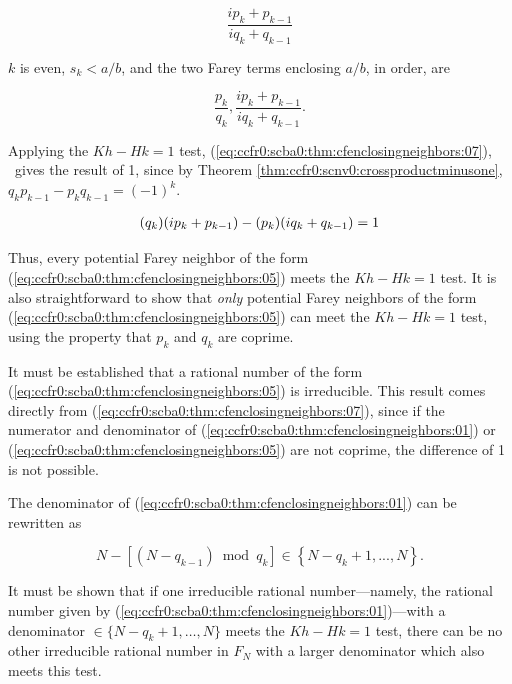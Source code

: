 \begin{vworktheoremproof}
\begin{equation}
\label{eq:ccfr0:scba0:thm:cfenclosingneighbors:05}
\frac{{ip_k  + p_{k - 1} }}{{iq_k  + q_{k - 1} }}
\end{equation}

$k$ is even, $s_k < a/b$, and the two Farey terms enclosing $a/b$, in
order, are

\begin{equation}
\label{eq:ccfr0:scba0:thm:cfenclosingneighbors:06}
\frac{p_k }{q_k },\frac{ip_k  + p_{k - 1} }{iq_k  + q_{k - 1} }.
\end{equation}

Applying the $Kh - Hk = 1$ test, (\ref{eq:ccfr0:scba0:thm:cfenclosingneighbors:07}), \
gives the
result of 1, since by Theorem
\ref{thm:ccfr0:scnv0:crossproductminusone},
$q_kp_{k-1}-p_kq_{k-1}=(-1)^k$.

\begin{equation}
\label{eq:ccfr0:scba0:thm:cfenclosingneighbors:07}
\begin{array}{*{20}c}
{(q_k )(ip_k  + p_{k - 1} ) - (p_k )(iq_k  + q_{k - 1} ) = 1}
\end{array}
\end{equation}

Thus, every potential Farey neighbor of the form (\ref{eq:ccfr0:scba0:thm:cfenclosingneighbors:05})
meets the $Kh - Hk = 1$ test.  It is also straightforward
to show that \emph{only} potential Farey neighbors of the
form (\ref{eq:ccfr0:scba0:thm:cfenclosingneighbors:05}) can meet the $Kh-Hk=1$ test, using the
property that $p_k$ and $q_k$ are coprime.

It must be established that a
rational number of the form (\ref{eq:ccfr0:scba0:thm:cfenclosingneighbors:05})
is irreducible.  This result comes directly from 
(\ref{eq:ccfr0:scba0:thm:cfenclosingneighbors:07}),
since if the numerator
and denominator of (\ref{eq:ccfr0:scba0:thm:cfenclosingneighbors:01}) or
(\ref{eq:ccfr0:scba0:thm:cfenclosingneighbors:05}) are not coprime, the difference of 1 is
not possible.

The denominator of (\ref{eq:ccfr0:scba0:thm:cfenclosingneighbors:01})
can be rewritten as

\begin{equation}
\label{eq:ccfr0:scba0:thm:cfenclosingneighbors:08}
N - \left[ {\left( {N - q_{k - 1} } \right)\bmod q_k } \right] \in \left\{ {N - q_k  + 1,...,N} \right\}.
\end{equation}

It must be shown that if one irreducible
rational number---namely, the rational number given by
(\ref{eq:ccfr0:scba0:thm:cfenclosingneighbors:01})---with a denominator
$\in \{ N-q_k+1,\ldots{} ,N \}$ meets the $Kh - Hk = 1$
test, there can be no other irreducible rational number
in $F_N$ with a larger
denominator which also meets this test.


\end{vworktheoremproof}
